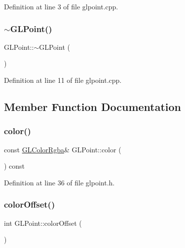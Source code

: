 Definition at line 3 of file glpoint.\+cpp.

\mbox{\label{class_g_l_point_a724612288b8fecea43cdb207e6e447cf}} 
\subsubsection{\texorpdfstring{$\sim$GLPoint()}{~GLPoint()}}
{\footnotesize\ttfamily G\+L\+Point\+::$\sim$\+G\+L\+Point (\begin{DoxyParamCaption}{ }\end{DoxyParamCaption})}



Definition at line 11 of file glpoint.\+cpp.



\subsection{Member Function Documentation}
\mbox{\label{class_g_l_point_a7f360810a20e379f02c1f2a00f56cc3e}} 
\subsubsection{\texorpdfstring{color()}{color()}}
{\footnotesize\ttfamily const \mbox{\hyperlink{class_g_l_color_rgba}{G\+L\+Color\+Rgba}}\& G\+L\+Point\+::color (\begin{DoxyParamCaption}{ }\end{DoxyParamCaption}) const\hspace{0.3cm}{\ttfamily [inline]}}



Definition at line 36 of file glpoint.\+h.

\mbox{\label{class_g_l_point_a91ba1c6cd816cb5e1e11a233ea0d1328}} 
\subsubsection{\texorpdfstring{colorOffset()}{colorOffset()}}
{\footnotesize\ttfamily int G\+L\+Point\+::color\+Offset (\begin{DoxyParamCaption}{ }\end{DoxyParamCaption})\hspace{0.3cm}{\ttfamily [static]}}




